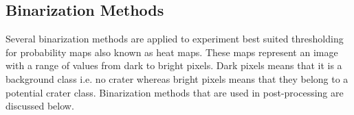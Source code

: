 \documentclass[11pt]{article}
\begin{document}
\subsection{Binarization Methods}
Several binarization methods are applied to experiment best suited thresholding for probability maps also known as heat maps. These maps represent an image with a range of values from dark to bright pixels. Dark pixels means that it is a background class i.e. no crater whereas bright pixels means that they belong to a potential crater class. Binarization methods that are used in post-processing are discussed below.

%
%

%
%
\end{document}
